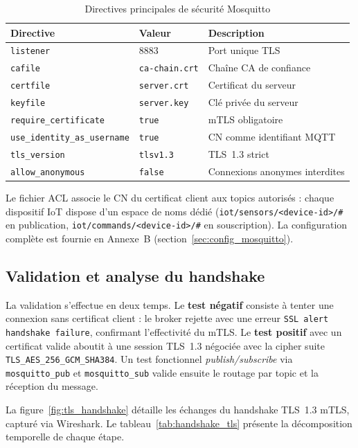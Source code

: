 \begin{table}[H]
\centering
\caption{Directives principales de sécurité Mosquitto}
\label{tab:mosquitto_directives}
\begin{tabular}{llp{5.5cm}}
\toprule
\textbf{Directive} & \textbf{Valeur} & \textbf{Description} \\
\midrule
\texttt{listener} & 8883 & Port unique TLS \\
\texttt{cafile} & \texttt{ca-chain.crt} & Chaîne CA de confiance \\
\texttt{certfile} & \texttt{server.crt} & Certificat du serveur \\
\texttt{keyfile} & \texttt{server.key} & Clé privée du serveur \\
\texttt{require\_certificate} & \texttt{true} & mTLS obligatoire \\
\texttt{use\_identity\_as\_username} & \texttt{true} & CN comme identifiant MQTT \\
\texttt{tls\_version} & \texttt{tlsv1.3} & TLS~1.3 strict \\
\texttt{allow\_anonymous} & \texttt{false} & Connexions anonymes interdites \\
\bottomrule
\end{tabular}
\end{table}

Le fichier ACL associe le CN du certificat client aux topics autorisés : chaque dispositif IoT dispose d'un espace de noms dédié (\texttt{iot/sensors/<device-id>/\#} en publication, \texttt{iot/commands/<device-id>/\#} en souscription). La configuration complète est fournie en Annexe~B (section~\ref{sec:config_mosquitto}).

\subsection{Validation et analyse du handshake}

La validation s'effectue en deux temps. Le \textbf{test négatif} consiste à tenter une connexion sans certificat client : le broker rejette avec une erreur \texttt{SSL alert handshake failure}, confirmant l'effectivité du mTLS. Le \textbf{test positif} avec un certificat valide aboutit à une session TLS~1.3 négociée avec la cipher suite \texttt{TLS\_AES\_256\_GCM\_SHA384}. Un test fonctionnel \textit{publish/subscribe} via \texttt{mosquitto\_pub} et \texttt{mosquitto\_sub} valide ensuite le routage par topic et la réception du message.

La figure~\ref{fig:tls_handshake} détaille les échanges du handshake TLS~1.3 mTLS, capturé via Wireshark. Le tableau~\ref{tab:handshake_tls} présente la décomposition temporelle de chaque étape.

